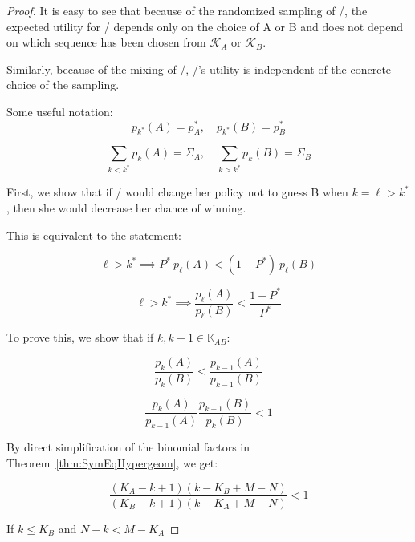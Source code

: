 \documentclass{article}
\theoremstyle{definition}
\begin{document}
\begin{proof}
It is easy to see that because of the randomized sampling of \PI/, the expected utility for \PII/ depends only on the choice of A or B and does not depend on which sequence has been chosen from $\mathcal{K}_A$ or $\mathcal{K}_B$.

Similarly, because of the mixing of \PII/, \PI/'s utility is independent of the concrete choice of the sampling.

Some useful notation:
\begin{equation}
\label{eq:FisherNotation_p*AB}
    p_{k^*}(A) = p^*_A, \quad p_{k^*}(B) = p^*_B
\end{equation}

\begin{equation}
\label{eq:FisherNotation_SigmaAB}
    \sum_{k < k^*} p_k(A) = \Sigma_A, \quad \sum_{k > k^*} p_k(B) = \Sigma_B
\end{equation}


First, we show that if \PI/ would change her policy not to guess B when $k=\ell > k^*$, then she would decrease her chance of winning.

This is equivalent to the statement:

\begin{equation}
    \label{le:PpA>QpB}
    \ell > k^* \implies P^* \ p_\ell(A) < (1-P^*) \  p_\ell(B)
\end{equation}

\begin{equation}
    \ell > k^* \implies  \frac{p_\ell(A)}{p_\ell(B)} < \frac{1-P^*}{P^*}
\end{equation}

To prove this, we show that if $k, k-1 \in \mathbb{K}_{AB}$:

\begin{equation}
    \label{le:pa/pb}
    \frac{p_{k}(A)}{p_{k}(B)} < \frac{p_{k-1}(A)}{p_{k-1}(B)}
\end{equation}

\begin{equation}
    \frac{p_{k}(A)}{p_{k-1}(A)} \frac{p_{k-1}(B)}{p_{k}(B)} < 1
\end{equation}

By direct simplification of the binomial factors in Theorem~\ref{thm:SymEqHypergeom}, we get:

\begin{equation}
    \frac{(K_A-k+1) (k-K_B+M-N)}{(K_B-k+1) (k-K_A+M-N)} < 1
\end{equation}

If $k \le K_B$ and $N-k < M-K_A$


\end{proof}
\end{document}
